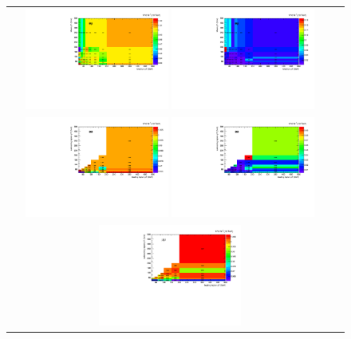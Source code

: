 \begin{figure}[htb]
  \begin{center}
    \begin{tabular}{cc}
      \includegraphics[width=0.45\textwidth]{fig_2016postVFP_TrigSF/h2D_lepABpt_emu.pdf}
      \includegraphics[width=0.45\textwidth]{fig_2016postVFP_TrigSF/h2D_lepABpt_emu_BinErrors.pdf}\\       
      \includegraphics[width=0.45\textwidth]{fig_2016postVFP_TrigSF/h2D_lepABpt_ee.pdf}
      \includegraphics[width=0.45\textwidth]{fig_2016postVFP_TrigSF/h2D_lepABpt_ee_BinErrors.pdf}\\
      \includegraphics[width=0.45\textwidth]{fig_2016postVFP_TrigSF/h2D_lepABpt_mumu.pdf}

\end{tabular}
\end{center}
\end{figure}
